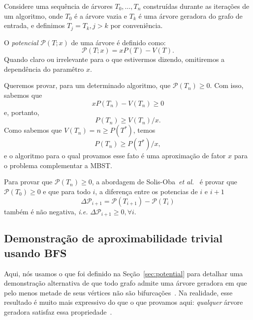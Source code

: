 \documentclass[conference]{IEEEtran}
\begin{document}
Considere uma sequ\^encia de \'arvores $T_0, \dots, T_n$ constru\'idas durante as itera\c{c}\~oes
de um algoritmo, onde $T_0$ \'e a \'arvore vazia e $T_k$ \'e uma \'arvore geradora do grafo de
entrada, e definimos $T_j = T_k, j > k$ por conveni\^encia.

O \emph{potencial} $\mathcal{P}(T; x)$ de uma \'arvore \'e definido como:
\begin{equation} \label{eq:potential}
  \mathcal{P}(T; x) = xP(T) - V(T).
\end{equation}
Quando claro ou irrelevante para o que estivermos dizendo, omitiremos a depend\^encia do param\^etro
$x$.

Queremos provar, para um determinado algoritmo, que $\mathcal{P}(T_n) \ge 0$. Com isso, sabemos que
\begin{equation}
   xP(T_n) - V(T_n) \ge 0
\end{equation}
e, portanto,
\begin{equation} \label{eq:tigher-bound}
  P(T_n) \ge V(T_n)/x.
\end{equation}
Como sabemos que $V(T_n) = n \ge P(T^*)$, temos
\begin{equation} \label{eq:pot-obj}
  P(T_n) \ge P(T^*)/x,
\end{equation}
e o algoritmo para o qual provamos esse fato \'e uma aproxima\c{c}\~ao de fator $x$ para o problema
complementar a MBST.

Para provar que $\mathcal{P}(T_n) \ge 0$, a abordagem de
Solis-Oba~\textit{et al.}~\cite{solis-oba2017} \'e provar que $\mathcal{P}(T_0) \ge 0$ e que para
todo $i$, a diferen\c{c}a entre os potencias de $i$ e $i+1$
\begin{equation}
  \Delta \mathcal{P}_{i + 1} = \mathcal{P}(T_{i + 1}) - \mathcal{P}(T_i)
\end{equation}
tamb\'em \'e n\~ao negativa, \textit{i.e.} $\Delta \mathcal{P}_{i + 1} \ge 0, \forall i$.

\subsection{Demonstra\c{c}\~ao de aproximabilidade trivial usando BFS} \label{sec:bfs}

Aqui, n\'os usamos o que foi definido na Se\c{c}\~ao~\ref{sec:potential} para detalhar uma
demonstra\c{c}\~ao alternativa de que todo grafo admite uma \'arvore geradora em que pelo menos
metade de seus v\'ertices n\~ao s\~ao bifurca\c{c}\~oes~\cite{chimani2015}.
Na realidade, esse resultado \'e muito mais expressivo do que o que provamos aqui: \emph{qualquer}
\'arvore geradora satisfaz essa propriedade~\cite{chimani2015}.
\end{document}

